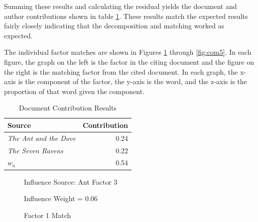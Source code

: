 \documentclass{article}
\begin{document}
Summing these results and calculating the residual yields the document
and author contributions shown in table \ref{tab:docresults}.  These
results match the expected results fairly closely indicating that the
decomposition and matching worked as expected.

The individual factor matches are shown in Figures \ref{fig:com1}
through \ref{fig:com5}.  In each figure, the graph on the left is the
factor in the citing document and the figure on the right is the
matching factor from the cited document.  In each graph, the x-axis is
the component of the factor, the y-axis is the word, and the z-axis is
the proportion of that word given the component.

\begin{table}
    \begin{tabular}{l|r}
        {\bf Source} & {\bf Contribution} \\
        \hline
        {\em The Ant and the Dove} & 0.24 \\
        {\em The Seven Ravens} & 0.22 \\
        $w_a$ & 0.54
    \end{tabular}
    \caption{Document Contribution Results}
    \label{tab:docresults}
\end{table}

\begin{figure}%
    \centering
    \qquad
    \caption{Factor 1 Match}%
    \label{fig:com1}%
    Influence Source: Ant Factor 3 
    \par Influence Weight = 0.06
\end{figure}
\end{document}
